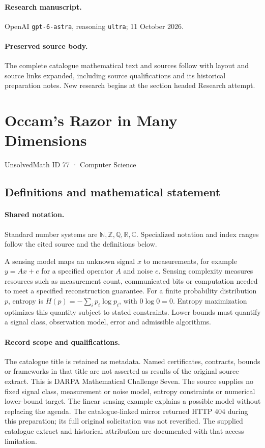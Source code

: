 \documentclass[11pt]{article}
\begin{document}
\paragraph{Research manuscript.} OpenAI \texttt{gpt-6-astra}, reasoning \texttt{ultra}; 11 October 2026.
\paragraph{Preserved source body.} The complete catalogue mathematical text and sources follow with layout and source links expanded, including source qualifications and its historical preparation notes. New research begins at the section headed Research attempt.

\section{Occam's Razor in Many Dimensions}\label{77}
{\small UnsolvedMath ID 77 · Computer Science}
\subsection{Definitions and mathematical statement}

\paragraph{Shared notation.}Standard number systems are $\mathbb N,\mathbb Z,\mathbb Q,\mathbb R,\mathbb C$. Specialized notation and index ranges follow the cited source and the definitions below.


A sensing model maps an unknown signal $x$ to measurements, for example $y=Ax+e$ for a specified operator $A$ and noise $e$. Sensing complexity measures resources such as measurement count, communicated bits or computation needed to meet a specified reconstruction guarantee. For a finite probability distribution $p$, entropy is $H(p)=-\sum_i p_i\log p_i$, with $0\log0=0$. Entropy maximization optimizes this quantity subject to stated constraints. Lower bounds must quantify a signal class, observation model, error and admissible algorithms.
\paragraph{Record scope and qualifications.}
The catalogue title is retained as metadata. Named certificates, contracts, bounds or frameworks in that title are not asserted as results of the original source extract.
This is DARPA Mathematical Challenge Seven. The source supplies no fixed signal class, measurement or noise model, entropy constraints or numerical lower-bound target. The linear sensing example explains a possible model without replacing the agenda. The catalogue-linked mirror returned HTTP 404 during this preparation; its full original solicitation was not reverified. The supplied catalogue extract and historical attribution are documented with that access limitation.
\end{document}
